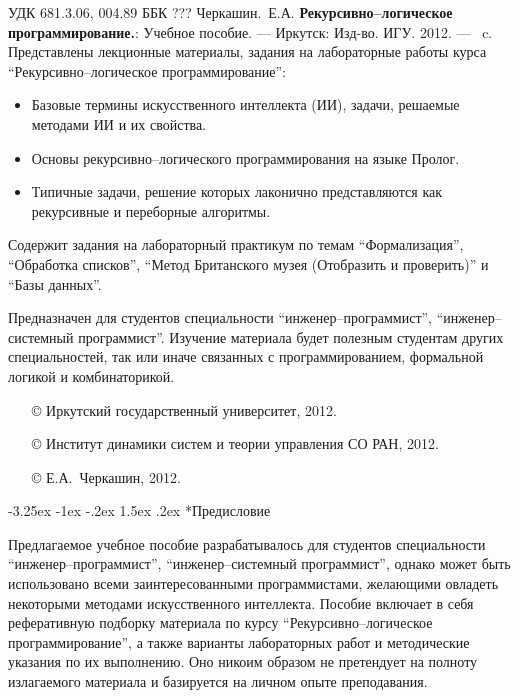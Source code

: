 \documentclass[12pt, openany, twoside]{book} %
\makeatletter
\newenvironment{mygroup}{}{}
\renewcommand\section{\@startsection {section}{1}{\z@}%
                                   {-3.25ex \@plus -1ex \@minus -.2ex}%
                                   {1.5ex \@plus.2ex}%
                                   {\normalfont\large\bfseries}}
\makeatother
\begin{document}
\newpage
\begin{mygroup}
\thispagestyle{empty}
\noindent УДК 681.3.06, 004.89 ББК ???
\vfill%
{Черкашин.~Е.А.} {\bf Рекурсивно--логическое программирование.}: Учебное пособие. ---
Иркутск: Изд-во. ИГУ. 2012. --- \pageref{pg:lastpage}~c.
\vfill
Представлены лекционные материалы, задания на лабораторные работы курса
``Рекурсивно--логическое программирование'':
\begin{itemize}
\item Базовые термины искусственного интеллекта (ИИ), задачи, решаемые методами
ИИ и их свойства.
\item Основы рекурсивно--логического программирования на языке Пролог.
\item Типичные задачи, решение которых лаконично представляются как рекурсивные и переборные алгоритмы.
\end{itemize}
Содержит задания на лабораторный практикум по темам ``Формализация'',
``Обработка списков'', ``Метод Британского музея (Отобразить и проверить)'' и ``Базы данных''.

    Предназначен для студентов специальности
``инженер--программист'', ``инженер--системный программист''.
Изучение материала будет полезным студентам других специальностей, так или иначе связанных с программированием, формальной логикой и комбинаторикой.

\vfill\vfill

\vfill
\hbox{}\hfill
\begin{minipage}{0.6\linewidth}
\begin{itemize}
\setlength{\itemsep}{0pt}
\setlength{\parsep}{0pt}
\item[\copyright{}] Иркутский государственный университет, 2012.\item[\copyright{}] Институт динамики систем и теории управления СО РАН, 2012.
\item[\copyright{}] Е.А.~Черкашин, 2012.
\end{itemize}
\end{minipage}
\end{mygroup}
\tableofcontents
\clearpage

\newpage
\section*{Предисловие}
\thispagestyle{empty}

Предлагаемое учебное пособие разрабатывалось для студентов специальности ``инженер--программист'', ``инженер--системный
программист'', однако может быть использовано всеми заинтересованными программистами, желающими овладеть некоторыми методами искусственного интеллекта. Пособие включает в себя рефе\-ра\-тив\-ную подборку материала по курсу ``Рекурсивно--логическое программирование'', а также варианты лабораторных работ и методические указания по их выполнению. Оно никоим образом не претендует на полноту излагаемого материала и базируется на личном опыте преподавания.
\end{document}
